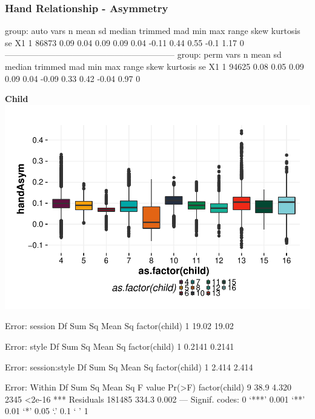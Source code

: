 \documentclass{article}
\begin{document}
\subsubsection{Hand Relationship - Asymmetry}
\begin{Schunk}
\begin{Soutput}
group: auto
   vars     n mean   sd median trimmed  mad   min  max range skew kurtosis se
X1    1 86873 0.09 0.04   0.09    0.09 0.04 -0.11 0.44  0.55 -0.1     1.17  0
------------------------------------------------------------ 
group: perm
   vars     n mean   sd median trimmed  mad   min  max range  skew kurtosis se
X1    1 94625 0.08 0.05   0.09    0.09 0.04 -0.09 0.33  0.42 -0.04     0.97  0
\end{Soutput}
\end{Schunk}

\textbf{Child}
\includegraphics{features-plot_handAsymmetry_child_quiz}

\begin{Schunk}
\begin{Soutput}
Error: session
              Df Sum Sq Mean Sq
factor(child)  1  19.02   19.02

Error: style
              Df Sum Sq Mean Sq
factor(child)  1 0.2141  0.2141

Error: session:style
              Df Sum Sq Mean Sq
factor(child)  1  2.414   2.414

Error: Within
                  Df Sum Sq Mean Sq F value Pr(>F)    
factor(child)      9   38.9   4.320    2345 <2e-16 ***
Residuals     181485  334.3   0.002                   
---
Signif. codes:  0 ‘***’ 0.001 ‘**’ 0.01 ‘*’ 0.05 ‘.’ 0.1 ‘ ’ 1
\end{Soutput}
\end{Schunk}
\end{document}
